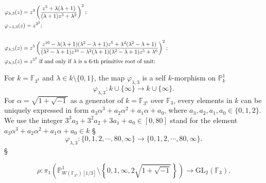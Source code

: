 \documentclass[12pt,twoside]{book}
\theoremstyle{plain}
\theoremstyle{definition}
\theoremstyle{remark}
\newcommand{\bF}{{\mathbb F}}
\numberwithin{equation}{section}
\begin{document}
\begin{equation*}
\begin{split}
&\varphi_{\lambda,3}(z)= z^3 \left(\frac{z^3+\lambda(\lambda+1)}{(\lambda+1)z^3+\lambda^2}\right)^2;\\
& \varphi_{-1,3}(z)=z^{3^2};\\
&\makebox[16cm]{}\\
& \varphi_{\lambda,5}(z)= z^5\left(\frac{z^{10}-\lambda(\lambda+1)(\lambda^2-\lambda+1)z^5+\lambda^4(\lambda^2-\lambda+1)}{(\lambda^2-\lambda+1)z^{10}-\lambda^2(\lambda+1)(\lambda^2-\lambda+1)z^5+\lambda^6 }\right)^2;\\
&\varphi_{\lambda,5}(z)=z^{5^2} \text{ if and only if  $\lambda$ is a $6$-th primitive root of unit}; \\
\end{split}
\end{equation*}  




For  $k=\bF_{3^4}$ and  $\lambda\in k\setminus\{0,1\}$, the map $\varphi_{\lambda,3}$ is a self $k$-morphism on $\mathbb P^1_k$
\[\varphi_{\lambda,3}:k\cup \{\infty\}\rightarrow k\cup \{\infty\}.\] 
For  $\alpha=\sqrt{1+\sqrt{-1}}$ as  a  generator of $k=\bF_{3^4}$ over $\bF_3$, every elements in $k$ can be uniquely expressed in form $a_3\alpha^3+a_2\alpha^2+a_1\alpha+a_0$, where $a_3,a_2,a_1,a_0\in\{0,1,2\}$. \\[.2cm]
We use the integer $3^3a_3+3^2a_2+3a_1+a_0\in [0,80]$ stand for the element $a_3\alpha^3+a_2\alpha^2+a_1\alpha+a_0\in k$
§\[\varphi_{\lambda,3}:\{0,1,2,\cdots,80,\infty\}\rightarrow \{0,1,2,\cdots,80,\infty\}.\]§





\begin{center}
\end{center} 
  \[\rho: \pi_1\left(\mathbb P_{W(\bF_{3^4})[1/3]}^1\setminus\left\{0,1,\infty,2\sqrt{1+\sqrt{-1}}\right\}\right)\longrightarrow \mathrm{GL}_2(\bF_3).\]
\end{document}
